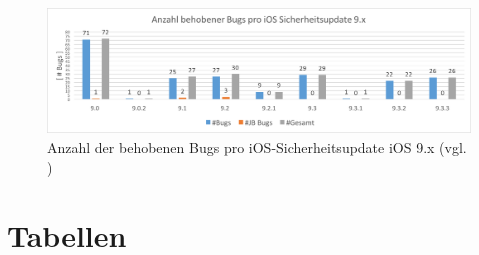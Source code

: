 \begin{figure}[ht!]
        \centering
                \includegraphics[scale=0.55]{Bilder/iOSSicherheitsupdate9.png}
        \caption{Anzahl der behobenen Bugs pro iOS-Sicherheitsupdate iOS 9.x \newline (vgl. \cite{Apple[7]}) \protect\footnotemark}
        \label{fig:AnalyseiOSSicherheitsupdate9}
\end{figure}
\newpage

\chapter{Tabellen}
\newpage

